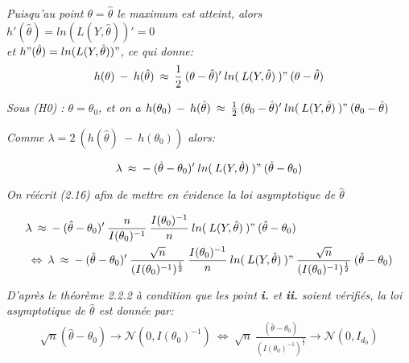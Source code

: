 \documentclass[12pt,fleqn]{book} %
\begin{document}
\textit{Puisqu'au point $\theta=\hat{\theta}$ le maximum est atteint, alors $h'(\hat{\theta})=ln(L(Y,\hat{\theta}))'=0$\\ 
et $h"(\hat{\theta})=ln(L(Y,\hat{\theta}))"$, ce qui donne:\\}
\[ 
h(\theta)\:-\:h(\hat{\theta})\:\approx\: \frac{1}{2} \:(\theta-\hat{\theta})'\:ln(\:L(Y,\hat{\theta})\:)"\:(\theta-\hat{\theta})
\]

\textit{Sous (H0) : $\theta=\theta_0$, et on a $h(\theta_0)\:-\:h(\hat{\theta})\:\approx\: \frac{1}{2}\:(\theta_0-\hat{\theta})'\:ln(\:L(Y,\hat{\theta})\:)"\:(\theta_0-\hat{\theta})$} 

\vspace{1em}

\textit{Comme $\lambda=2\:\left( h(\hat{\theta})\:-\:h(\theta_0)\right)$ alors:}

\begin{equation}
\lambda\:\approx\:-\:(\hat{\theta}-\theta_0)'\:ln(\:L(Y,\hat{\theta})\:)"\:(\hat{\theta}-\theta_0)
\end{equation}

\vspace{0.5em}

\textit{On réécrit (2.16) afin de mettre en évidence la loi asymptotique de $\hat{\theta}$}

\begin{align*}
&\lambda\:\approx\:-\:(\hat{\theta}-\theta_0)'\:\frac{n}{I(\theta_0)^{-1}}\:\frac{I(\theta_0)^{-1}}{n}\:ln(\:L(Y,\hat{\theta})\:)"\:(\hat{\theta}-\theta_0)\\
&\:\Leftrightarrow\: \lambda\:\approx\:-\:(\hat{\theta}-\theta_0)'\:\frac{\sqrt{n}}{(I(\theta_0)^{-1})^{\frac{1}{2}}}\:\frac{I(\theta_0)^{-1}}{n}\:ln(\:L(Y,\hat{\theta})\:)"\:\frac{\sqrt{n}}{(I(\theta_0)^{-1})^{\frac{1}{2}}}\:(\hat{\theta}-\theta_0)
\end{align*}

\vspace{0.5em}

\textit{D'après le théorème 2.2.2 à condition que les point \textbf{i.} et \textbf{ii.} soient vérifiés, la loi asymptotique de $\hat{\theta}$ est donnée par:}
\begin{align*}
 \sqrt{n}(\hat{\theta}-\theta_0)\rightarrow \mathcal{N}(0,I(\theta_0)^{-1}) \:\Leftrightarrow\: \sqrt{n}\:\frac{(\hat{\theta}-\theta_0)}{(I(\theta_0)^{-1})^{\frac{1}{2}}}\rightarrow \mathcal{N}(0,I_{d_0})
\end{align*}

\vspace{0.5em}
\end{document}
